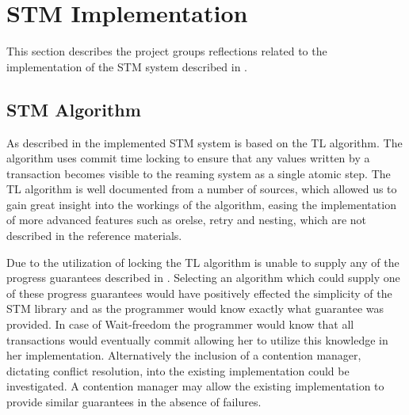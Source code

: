\section{STM Implementation}
This section describes the project groups reflections related to the implementation of the \ac{STM} system described in .

\subsection{STM Algorithm}
As described in  the implemented \ac{STM} system is based on the TL algorithm\cite{dice2006transactional}. The algorithm uses commit time locking to ensure that any values written by a transaction becomes visible to the reaming system as a single atomic step. The TL algorithm is well documented from a number of sources\cite{dice2006transactional}\cite[p. 438]{herlihy2012art}\cite[p. 106]{harris2010transactional}, which allowed us to gain great insight into the workings of the algorithm, easing the implementation of more advanced features such as orelse, retry and nesting, which are not described in the reference materials.

Due to the utilization of locking the TL algorithm is unable to supply any of the progress guarantees described in . Selecting an algorithm which could supply one of these progress guarantees would have positively effected the simplicity of the \ac{STM} library and \stmname as the programmer would know exactly what guarantee was provided. In case of Wait-freedom the programmer would know that all transactions would eventually commit allowing her to utilize this knowledge in her implementation. Alternatively the inclusion of a contention manager, dictating conflict resolution, into the existing implementation could be investigated. A contention manager may allow the existing implementation to provide similar guarantees in the absence of failures.
